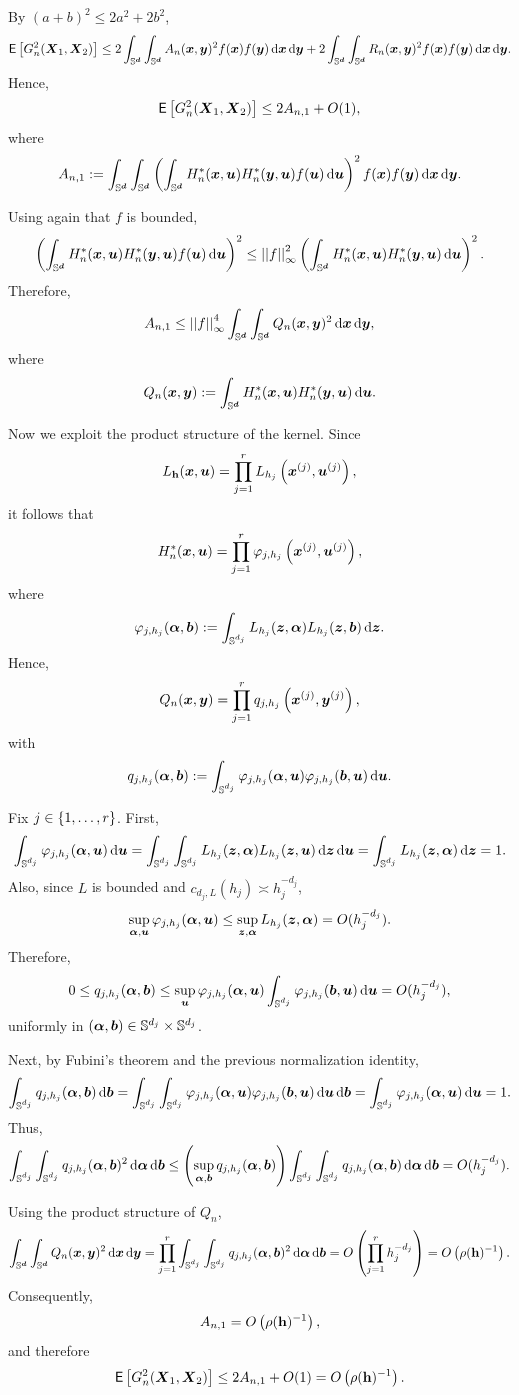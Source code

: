 \documentclass{article}
\begin{document}
By \((a+b)^2\leq 2a^2+2b^2\),
\[
\mathsf{E}\lrc{G_n^2(\bX_1,\bX_2)}
\leq
2\int_{\Sr}\int_{\Sr}A_n(\bx,\by)^2f(\bx)f(\by)\,\rd \bx\,\rd \by
+
2\int_{\Sr}\int_{\Sr}R_n(\bx,\by)^2f(\bx)f(\by)\,\rd \bx\,\rd \by.
\]
Hence,
\[
\mathsf{E}\lrc{G_n^2(\bX_1,\bX_2)} \leq 2A_{n,1}+O(1),
\]
where
\[
A_{n,1}
\defin
\int_{\Sr}\int_{\Sr}
\lrp{
\int_{\Sr}H_n^\ast(\bx,\bu)H_n^\ast(\by,\bu)f(\bu)\,\rd \bu
}^2
f(\bx)f(\by)\,\rd \bx\,\rd \by.
\]

Using again that \(f\) is bounded,
\[
\lrp{
\int_{\Sr}H_n^\ast(\bx,\bu)H_n^\ast(\by,\bu)f(\bu)\,\rd \bu
}^2
\leq
\norm{f}_\infty^2
\lrp{
\int_{\Sr}H_n^\ast(\bx,\bu)H_n^\ast(\by,\bu)\,\rd \bu
}^2.
\]
Therefore,
\[
A_{n,1}
\leq
\norm{f}_\infty^4
\int_{\Sr}\int_{\Sr}Q_n(\bx,\by)^2\,\rd \bx\,\rd \by,
\]
where
\[
Q_n(\bx,\by)\defin \int_{\Sr}H_n^\ast(\bx,\bu)H_n^\ast(\by,\bu)\,\rd \bu.
\]

Now we exploit the product structure of the kernel. Since
\[
L_{\bh}(\bx,\bu)=\prod_{j=1}^r L_{h_j}\lrp{\bx^{(j)},\bu^{(j)}},
\]
it follows that
\[
H_n^\ast(\bx,\bu)=\prod_{j=1}^r \varphi_{j,h_j}\lrp{\bx^{(j)},\bu^{(j)}},
\]
where
\[
\varphi_{j,h_j}(\ba,\bb)
\defin
\int_{\Sj}L_{h_j}(\bz,\ba)L_{h_j}(\bz,\bb)\,\rd \bz.
\]
Hence,
\[
Q_n(\bx,\by)=\prod_{j=1}^r q_{j,h_j}\lrp{\bx^{(j)},\by^{(j)}},
\]
with
\[
q_{j,h_j}(\ba,\bb)
\defin
\int_{\Sj}\varphi_{j,h_j}(\ba,\bu)\varphi_{j,h_j}(\bb,\bu)\,\rd \bu.
\]

Fix \(j\in\lrb{1,\ldots,r}\). First,
\[
\int_{\Sj}\varphi_{j,h_j}(\ba,\bu)\,\rd \bu
=
\int_{\Sj}\int_{\Sj}L_{h_j}(\bz,\ba)L_{h_j}(\bz,\bu)\,\rd \bz\,\rd \bu
=
\int_{\Sj}L_{h_j}(\bz,\ba)\,\rd \bz
=
1.
\]
Also, since \(L\) is bounded and \(c_{d_j,L}(h_j)\asymp h_j^{-d_j}\),
\[
\sup_{\ba,\bu}\varphi_{j,h_j}(\ba,\bu)
\leq
\sup_{\bz,\ba}L_{h_j}(\bz,\ba)
=
O(h_j^{-d_j}).
\]
Therefore,
\[
0\leq q_{j,h_j}(\ba,\bb)
\leq
\sup_{\bu} \varphi_{j,h_j}(\ba,\bu)\int_{\Sj}\varphi_{j,h_j}(\bb,\bu)\,\rd \bu
=
O(h_j^{-d_j}),
\]
uniformly in \((\ba,\bb)\in \Sj\times\Sj\).

Next, by Fubini's theorem and the previous normalization identity,
\[
\int_{\Sj}q_{j,h_j}(\ba,\bb)\,\rd \bb
=
\int_{\Sj}\int_{\Sj}\varphi_{j,h_j}(\ba,\bu)\varphi_{j,h_j}(\bb,\bu)\,\rd \bu\,\rd \bb
=
\int_{\Sj}\varphi_{j,h_j}(\ba,\bu)\,\rd \bu
=
1.
\]
Thus,
\[
\int_{\Sj}\int_{\Sj}q_{j,h_j}(\ba,\bb)^2\,\rd \ba\,\rd \bb
\leq
\lrp{\sup_{\ba,\bb}q_{j,h_j}(\ba,\bb)}
\int_{\Sj}\int_{\Sj}q_{j,h_j}(\ba,\bb)\,\rd \ba\,\rd \bb
=
O(h_j^{-d_j}).
\]

Using the product structure of \(Q_n\),
\[
\int_{\Sr}\int_{\Sr}Q_n(\bx,\by)^2\,\rd \bx\,\rd \by
=
\prod_{j=1}^r
\int_{\Sj}\int_{\Sj}q_{j,h_j}(\ba,\bb)^2\,\rd \ba\,\rd \bb
=
O\lrp{\prod_{j=1}^r h_j^{-d_j}}
=
O\lrp{\rho(\bh)^{-1}}.
\]
Consequently,
\[
A_{n,1}=O\lrp{\rho(\bh)^{-1}},
\]
and therefore
\[
\mathsf{E}\lrc{G_n^2(\bX_1,\bX_2)}
\leq 2A_{n,1}+O(1)
=
O\lrp{\rho(\bh)^{-1}}.
\]
\end{document}
